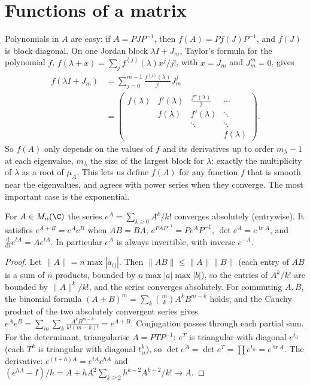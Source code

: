 \section{Functions of a matrix}

Polynomials in $A$ are easy: if $A=PJP^{-1}$, then $f(A)=Pf(J)P^{-1}$, and $f(J)$ is block diagonal. On one Jordan block
$\lambda I+J_m$, Taylor's formula for the polynomial $f$, $f(\lambda+x)=\sum_jf^{(j)}(\lambda)x^j/j!$, with $x=J_m$ and $J_m^m=0$,
gives
\begin{equation}\label{linear:eq:fjordan}
\begin{aligned}
f(\lambda I+J_m)&=\sum_{j=0}^{m-1}\frac{f^{(j)}(\lambda)}{j!}J_m^j\\
&=\begin{pmatrix}f(\lambda)&f'(\lambda)&\frac{f''(\lambda)}2&\cdots\\&f(\lambda)&f'(\lambda)&\ddots\\&&\ddots&\ddots\\&&&f(\lambda)\end{pmatrix}.
\end{aligned}
\end{equation}
So $f(A)$ only depends on the values of $f$ and its derivatives up to order $m_\lambda-1$ at each eigenvalue, $m_\lambda$ the size
of the largest block for $\lambda$: exactly the multiplicity of $\lambda$ as a root of $\mu_A$. This lets us define $f(A)$ for
any function $f$ that is smooth near the eigenvalues, and agrees with power series when they converge. The most
important case is the exponential.

\begin{proposition}\label{linear:prop:exp}
For $A\in M_n(\C)$ the series $e^A=\sum_{k\ge0}A^k/k!$ converges absolutely (entrywise). It satisfies $e^{A+B}=e^Ae^B$ when
$AB=BA$, $e^{PAP^{-1}}=Pe^AP^{-1}$, $\det e^A=e^{\operatorname{tr}A}$, and $\frac{\mathrm d}{\mathrm dt}e^{tA}=Ae^{tA}$. In
particular $e^A$ is always invertible, with inverse $e^{-A}$.
\end{proposition}
\begin{proof}
Let $\|A\|=n\max|a_{ij}|$. Then $\|AB\|\le\|A\|\|B\|$ (each entry of $AB$ is a sum of $n$ products, bounded by
$n\max|a|\max|b|$), so the entries of $A^k/k!$ are bounded by $\|A\|^k/k!$, and the series converges absolutely. For
commuting $A,B$, the binomial formula $(A+B)^m=\sum_k\binom mkA^kB^{m-k}$ holds, and the Cauchy product of the two absolutely
convergent series gives $e^Ae^B=\sum_m\sum_{k}\frac{A^kB^{m-k}}{k!(m-k)!}=e^{A+B}$. Conjugation passes through each partial
sum. For the determinant, triangularise $A=PTP^{-1}$: $e^T$ is triangular with diagonal $e^{t_{ii}}$ (each $T^k$ is triangular
with diagonal $t_{ii}^k$), so $\det e^A=\det e^T=\prod e^{t_{ii}}=e^{\operatorname{tr}A}$. The derivative: $e^{(t+h)A}=e^{tA}e^{hA}$
and $(e^{hA}-I)/h=A+hA^2\sum_{k\ge2}h^{k-2}A^{k-2}/k!\to A$.
\end{proof}

